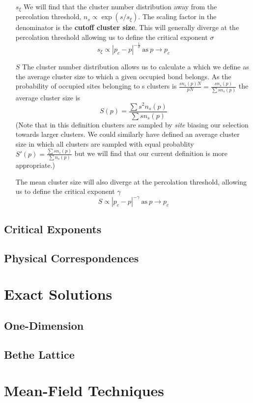 \begin{enumerate}
\item[$s_\xi$] We will find that the cluster number
distribution away from the percolation threshold, $n_s \propto \exp{(s/s_\xi)}$.
The scaling factor in the denominator is the \textbf{cutoff cluster size}.  This will
generally diverge at the percolation threshold allowing us to define the critical exponent
$\sigma$
\[ s_\xi \propto |p_c - p|^{-\frac{1}{\sigma}} \ \text{as}\ p\to p_c \]

\item[$S$] The cluster number distribution allows us to calculate a  which we define as the average cluster size to which a given occupied bond belongs.
As the probability of occupied sites belonging to s clusters is
\(\frac{sn_s(p)N}{pN} = \frac{sn_s(p)}{\sum sn_s(p)}\) the average cluster size is
\[S(p) = \frac{\sum s^2 n_s(p)}{\sum s n_s(p)}\]
(Note that in this definition clusters are sampled by \emph{site} biasing our selection
towards larger clusters.  We could similarly have defined an average cluster size in which
all clusters are sampled with equal probablity
\(S'(p) = \frac{\sum s n_s(p)}{\sum  n_s(p)}\) but we will find that our current definition
is more appropriate.)

The mean cluster size will also diverge at the percolation threshold, allowing us to
define the critical exponent $\gamma$
\[ S \propto |p_c - p|^{-\gamma} \ \text{as}\ p\to p_c \]
\end{enumerate}

\subsection{Critical Exponents}
\subsection{Physical Correspondences}
\section{Exact Solutions}
\subsection{One-Dimension}
\subsection{Bethe Lattice}
\section{Mean-Field Techniques}
